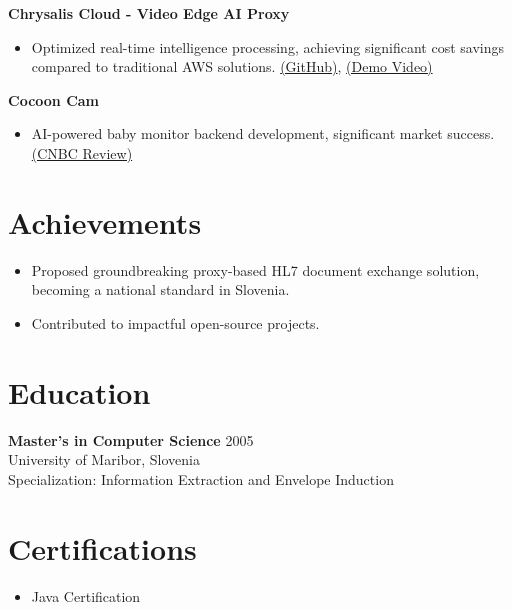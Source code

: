 \documentclass[11pt]{article}
\begin{document}
\textbf{Chrysalis Cloud - Video Edge AI Proxy}
\begin{itemize}
    \item Optimized real-time intelligence processing, achieving significant cost savings compared to traditional AWS solutions. \href{https://github.com/igorrendulic/video-edge-ai-proxy}{(GitHub)}, \href{https://www.youtube.com/watch?v=bWCgTW2Ar5s}{(Demo Video)}
\end{itemize}

\textbf{Cocoon Cam}
\begin{itemize}
    \item AI-powered baby monitor backend development, significant market success. \href{https://www.cnbc.com/2018/06/13/cocoon-cam-review-a-smart-baby-monitor-that-detects-breathing.html}{(CNBC Review)}
\end{itemize}

\section*{Achievements}
\begin{itemize}
    \item Proposed groundbreaking proxy-based HL7 document exchange solution, becoming a national standard in Slovenia.
    \item Contributed to impactful open-source projects.
\end{itemize}

\section*{Education}
\textbf{Master's in Computer Science} \hfill 2005\\
University of Maribor, Slovenia\\
Specialization: Information Extraction and Envelope Induction

\section*{Certifications}
\begin{itemize}
    \item Java Certification
\end{itemize}
\end{document}
